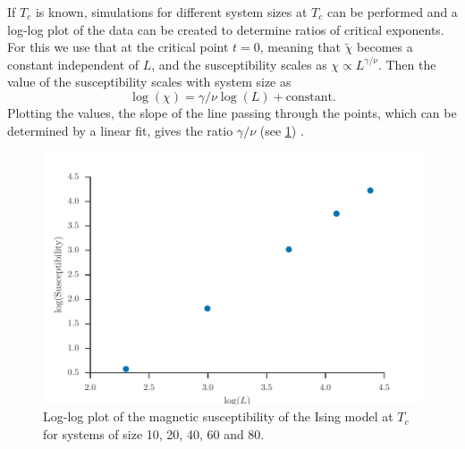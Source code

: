 \documentclass[11pt, a4paper]{report} %
\begin{document}
If \(T_c\) is known, simulations for different system sizes at \(T_c\) can be performed and a log-log plot of the data can be created to determine ratios of critical exponents.
For this we use that at the critical point \(t=0\), meaning that \(\widetilde{\chi}\) becomes a constant independent of \(L\), and the susceptibility scales as \(\chi \propto L^{\gamma/\nu}\).
Then the value of the susceptibility scales with system size as
\begin{equation}
	\log(\chi) = \gamma/\nu \log(L) + \mathrm{constant}.
\end{equation}
Plotting the values, the slope of the line passing through the points, which can be determined by a linear fit, gives the ratio \(\gamma/\nu\) (see \cref{fig:ising_magnetizabilities_loglog_plot}) \cite{corboz}.

\begin{figure}[htb]
	\centering
	\includegraphics[width=\textwidth]{ising_magnetizabilities_loglog_plot.pdf}
	\caption{Log-log plot of the magnetic susceptibility of the Ising model at \(T_c\) for systems of size 10, 20, 40, 60 and 80.}
	\label{fig:ising_magnetizabilities_loglog_plot}
\end{figure}
\end{document}
